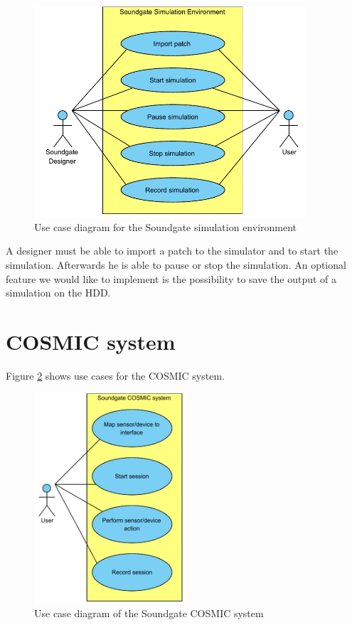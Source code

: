 	\begin{figure}[!h]
		\centering
			\includegraphics[width=0.90\textwidth]{images/Soundgate_Simulator.pdf}
		\caption{Use case diagram for the Soundgate simulation environment}
		\label{fig:Soundgate_Simulator}
	\end{figure}

A designer must be able to import a patch to the simulator and to start the simulation. Afterwards he is able to pause or stop the simulation. An optional feature we would like to implement is the possibility to save the output of a simulation on the HDD.

\section{COSMIC system}

Figure \ref{fig:Soundgate_UserInterface} shows use cases for the \ac{COSMIC} system.

	\begin{figure}[!h]
		\centering
			\includegraphics[width=0.50\textwidth]{images/User_View.pdf}
		\caption{Use case diagram of the Soundgate COSMIC system}
		\label{fig:Soundgate_UserInterface}
	\end{figure}
	
